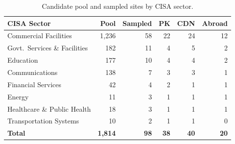 \documentclass[sigconf,anonymous,10pt]{acmart}
\begin{document}

\begin{table}[t]
\caption{Candidate pool and sampled sites by CISA sector.}
\label{tab:cisa-sample}
\footnotesize
\begin{tabular*}{\columnwidth}{@{\extracolsep{\fill}}lrrrrr}
\toprule
\textbf{CISA Sector} & \textbf{Pool} & \textbf{Sampled} & \textbf{PK} & \textbf{CDN} & \textbf{Abroad} \\
\midrule
Commercial Facilities             & 1{,}236 & 58 & 22 & 24 & 12 \\
Govt.\ Services \& Facilities     & 182     & 11 &  4 &  5 &  2 \\
Education                         & 177     & 10 &  4 &  4 &  2 \\
Communications                    & 138     &  7 &  3 &  3 &  1 \\
Financial Services                &  42     &  4 &  2 &  1 &  1 \\
Energy                            &  11     &  3 &  1 &  1 &  1 \\
Healthcare \& Public Health       &  18     &  3 &  1 &  1 &  1 \\
Transportation Systems            &  10     &  2 &  1 &  1 &  0 \\
\midrule
\textbf{Total}                    & \textbf{1{,}814} & \textbf{98} & \textbf{38} & \textbf{40} & \textbf{20} \\
\bottomrule
\end{tabular*}%
\end{table}
\end{document}
